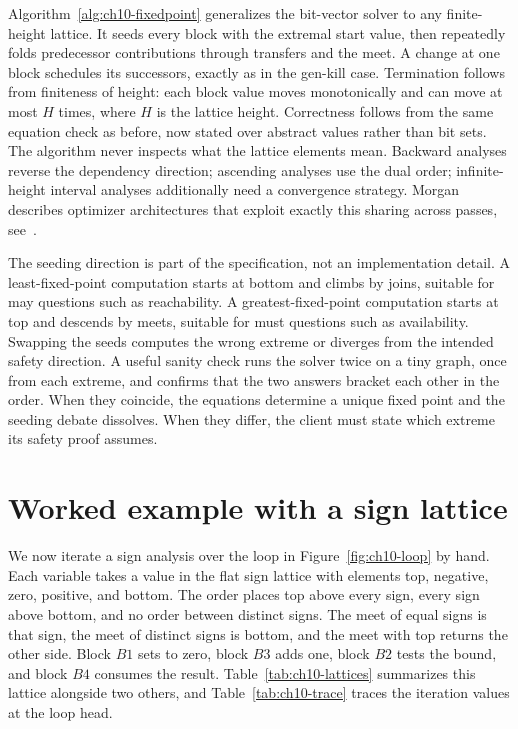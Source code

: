 Algorithm~\ref{alg:ch10-fixedpoint} generalizes the bit-vector solver to any finite-height lattice.
It seeds every block with the extremal start value, then repeatedly folds predecessor contributions through transfers and the meet.
A change at one block schedules its successors, exactly as in the gen-kill case.
Termination follows from finiteness of height: each block value moves monotonically and can move at most $H$ times, where $H$ is the lattice height.
Correctness follows from the same equation check as before, now stated over abstract values rather than bit sets.
The algorithm never inspects what the lattice elements mean.
Backward analyses reverse the dependency direction; ascending analyses use the dual order; infinite-height interval analyses additionally need a convergence strategy.
Morgan describes optimizer architectures that exploit exactly this sharing across passes, see~\cite{morgan-1998-optimizing}.

The seeding direction is part of the specification, not an implementation detail.
A least-fixed-point computation starts at bottom and climbs by joins, suitable for may questions such as reachability.
A greatest-fixed-point computation starts at top and descends by meets, suitable for must questions such as availability.
Swapping the seeds computes the wrong extreme or diverges from the intended safety direction.
A useful sanity check runs the solver twice on a tiny graph, once from each extreme, and confirms that the two answers bracket each other in the order.
When they coincide, the equations determine a unique fixed point and the seeding debate dissolves.
When they differ, the client must state which extreme its safety proof assumes.
\section{Worked example with a sign lattice}
\label{sec:ch10-worked}

We now iterate a sign analysis over the loop in Figure~\ref{fig:ch10-loop} by hand.
Each variable takes a value in the flat sign lattice with elements top, negative, zero, positive, and bottom.
The order places top above every sign, every sign above bottom, and no order between distinct signs.
The meet of equal signs is that sign, the meet of distinct signs is bottom, and the meet with top returns the other side.
Block $B1$ sets  to zero, block $B3$ adds one, block $B2$ tests the bound, and block $B4$ consumes the result.
Table~\ref{tab:ch10-lattices} summarizes this lattice alongside two others, and Table~\ref{tab:ch10-trace} traces the iteration values at the loop head.

